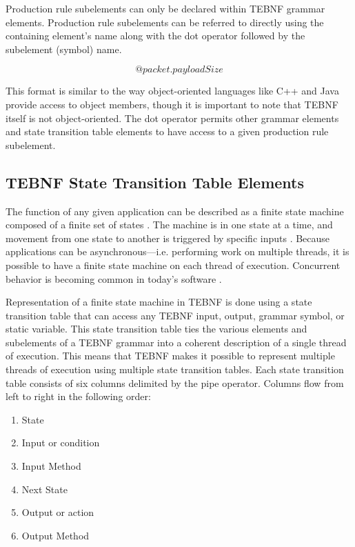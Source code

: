 \indent
Production rule subelements can only be declared within TEBNF grammar elements.  Production rule subelements can be referred to directly using the containing element’s name along with the dot operator followed by the subelement (symbol) name.

\begin{equation}
@packet.payloadSize
\label{ExampleDotOperator}
\end{equation}

\indent
This format is similar to the way object-oriented languages like C++ and Java provide access to object members, though it is important to note that TEBNF itself is not object-oriented.  The dot operator permits other grammar elements and state transition table elements to have access to a given production rule subelement.

\subsection{TEBNF State Transition Table Elements}
The function of any given application can be described as a finite state machine composed of a finite set of states \cite{lee_01}.  The machine is in one state at a time, and movement from one state to another is triggered by specific inputs \cite{lee_01}. Because applications can be asynchronous—i.e. performing work on multiple threads, it is possible to have a finite state machine on each thread of execution.  Concurrent behavior is becoming common in today’s software \cite{kahlon_01}.

\indent
Representation of a finite state machine in TEBNF is done using a state transition table that can access any TEBNF input, output, grammar symbol, or static variable.  This state transition table ties the various elements and subelements of a TEBNF grammar into a coherent description of a single thread of execution.  This means that TEBNF makes it possible to represent multiple threads of execution using multiple state transition tables.  Each state transition table consists of six columns delimited by the pipe operator.  Columns flow from left to right in the following order:
\begin{enumerate}
 \item State
 \item Input or condition
 \item Input Method
 \item Next State
 \item Output or action
 \item Output Method
\end{enumerate}

